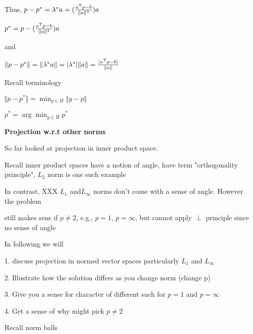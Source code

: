 Thus, $p-p^{*}=\lambda^{*} a=(\frac{a^{{\rm T}} p-b}{\Vert a\Vert^{2}})a$

$p^{*}=p-(\frac{a^{{\rm T}} p-b}{\Vert a\Vert^{2}})a$

and 

$\Vert p-p^{*}\Vert=\Vert \lambda^{*}a\Vert= \vert \lambda^{*}\vert \Vert a\Vert=\frac{\vert a^{{\rm T}} p-b\vert}{\Vert a\Vert}$

Recall terminology

$\Vert p-p^{*}\Vert=\min_{y\in H} \Vert y-p\Vert$

$p^{*}=\arg\min_{y\in H} p^{*}$


\vspace{0.5cm}
\noindent\textbf{Projection w.r.t other norms}

So far looked at projection in inner product space.

Recall inner product spaces have a notion of angle, have term "orthogonality principle", $L_{2}$ norm is one such example

In contrast, XXX $L_{1}$ and$ L_{\infty}$ norms don't come with a sense of angle. However the problem



still makes sens if $p\neq 2$, e.g., $p=1$, $p=\infty$, but cannot apply $\perp$ principle since no sense of angle

In following we will

1. discuss projection in normed vector spaces particularly $L_{1}$ and $L_{\infty}$

2. Illustrate how the solution differs as you change norm (change p)

3. Give you a sense for character of different such for $p=1$ and $p=\infty$

4. Get a sense of why might pick $p\neq 2$


Recall norm balls

\begin{marginfigure}
	\centering
	\resizebox{7.5cm}{3cm}{}
	\caption{}
	\label{}
\end{marginfigure}

\begin{marginfigure}
	\centering
	\resizebox{7.5cm}{3cm}{}
	\caption{}
	\label{}
\end{marginfigure}

\begin{marginfigure}
	\centering
	\resizebox{7.5cm}{3cm}{}
	\caption{}
	\label{}
\end{marginfigure}

